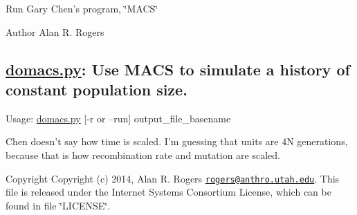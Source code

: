 Run Gary Chen's program, \char`\"{}\+M\+A\+C\+S\char`\"{}

\begin{DoxyAuthor}{Author}
Alan R. Rogers \subsection*{\hyperlink{domacs_8py}{domacs.\+py}\+: Use M\+A\+C\+S to simulate a history of constant population size. }
\end{DoxyAuthor}


Usage\+: \hyperlink{domacs_8py}{domacs.\+py} \mbox{[}-\/r or --run\mbox{]} output\+\_\+file\+\_\+basename

Chen doesn't say how time is scaled. I'm guessing that units are 4\+N generations, because that is how recombination rate and mutation are scaled.

\begin{DoxyCopyright}{Copyright}
Copyright (c) 2014, Alan R. Rogers \href{mailto:rogers@anthro.utah.edu}{\tt rogers@anthro.\+utah.\+edu}. This file is released under the Internet Systems Consortium License, which can be found in file \char`\"{}\+L\+I\+C\+E\+N\+S\+E\char`\"{}. 
\end{DoxyCopyright}

